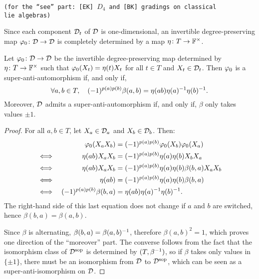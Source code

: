 {\tt (for the ``see'' part: [EK] $D_4$ and [BK] gradings on classical \\lie algebras)}

Since each component $\mathcal{D}_t$ of $\mathcal{D}$ is one-dimensional, an invertible degree-preserving map $\varphi_0\colon \mathcal{D} \to \mathcal{D}$ is completely determined by a map $\eta\colon T \to \mathbb{F}^\times$.

\begin{prop}\label{prop:superpolarization}
    Let $\varphi_0\colon \mathcal{D} \to \mathcal{D}$ be the invertible degree-preserving map determined by $\eta\colon T \to \mathbb{F}^\times$  such that $\varphi_0(X_t) = \eta(t) X_t$ for all $t\in T$ and $X_t\in \mathcal{D}_t$. 
    Then $\varphi_0$ is a super-anti-automorphism if, and only if,
    \begin{equation}\label{eq:superpolarization}
        \forall a,b\in T, \quad (-1)^{p(a) p(b)} \beta(a,b) =  \eta(ab) \eta(a)^{-1} \eta(b)^{-1}.
    \end{equation}
    Moreover, $\mathcal{D}$ admits a super-anti-automorphism if, and only if, $\beta$ only takes values $\pm 1$.
\end{prop}

\begin{proof}
    For all $a,b \in T$, let $X_a \in \mathcal{D}_a$ and $X_b\in \mathcal{D}_b$. Then:
    \begin{alignat*}{2}
        &&\varphi_0(X_a X_b) &= (-1)^{p(a) p(b)} \varphi_0(X_b) \varphi_0(X_a)\\
        \iff&&\,\, \eta(ab)X_a X_b &= (-1)^{p(a) p(b)} \eta(a) \eta(b) X_b X_a\\
        \iff&&\, \eta(ab)X_a X_b &= (-1)^{p(a) p(b)} \eta(a) \eta(b) \beta(b,a) X_a X_b\\
        \iff&& \eta(ab) &= (-1)^{p(a) p(b)} \eta(a) \eta(b) \beta(b,a)
        \\
        \iff&& (-1)^{p(a) p(b)} \beta(b, a) &=  \eta(ab) \eta(a)^{-1} \eta(b)^{-1}.
    \end{alignat*}
    The right-hand side of this last equation does not change if $a$ and $b$ are switched, hence $\beta(b,a) = \beta(a,b)$. 
    
    Since $\beta$ is alternating, $\beta(b, a) = \beta (a, b)^{-1}$, therefore $\beta(a,b)^2 = 1$, which proves one direction of the ``moreover'' part.
    The converse follows from the fact that the isomorphism class of $\mathcal{D}^{\mathrm{sop}}$ is determined by $(T, \beta^{-1})$, so if $\beta$ takes only values in $\{ \pm 1 \}$, there must be an isomorphism from $\mathcal{D}$ to $\mathcal{D}^{\mathrm{sop}}$, which can be seen as a super-anti-isomorphism on $\mathcal{D}$.
\end{proof}

